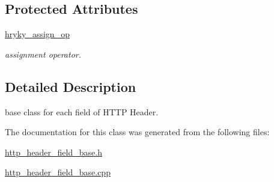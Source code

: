 \subsection*{Protected Attributes}
\begin{DoxyCompactItemize}
\item 
\hypertarget{classhryky_1_1http_1_1header_1_1field_1_1_base_abc0459254ec0fd613c4f25e77882eb16}{\hyperlink{classhryky_1_1http_1_1header_1_1field_1_1_base_abc0459254ec0fd613c4f25e77882eb16}{hryky\-\_\-assign\-\_\-op}}\label{classhryky_1_1http_1_1header_1_1field_1_1_base_abc0459254ec0fd613c4f25e77882eb16}

\begin{DoxyCompactList}\small\item\em assignment operator. \end{DoxyCompactList}\end{DoxyCompactItemize}


\subsection{Detailed Description}
base class for each field of H\-T\-T\-P Header. 

The documentation for this class was generated from the following files\-:\begin{DoxyCompactItemize}
\item 
\hyperlink{http__header__field__base_8h}{http\-\_\-header\-\_\-field\-\_\-base.\-h}\item 
\hyperlink{http__header__field__base_8cpp}{http\-\_\-header\-\_\-field\-\_\-base.\-cpp}\end{DoxyCompactItemize}
